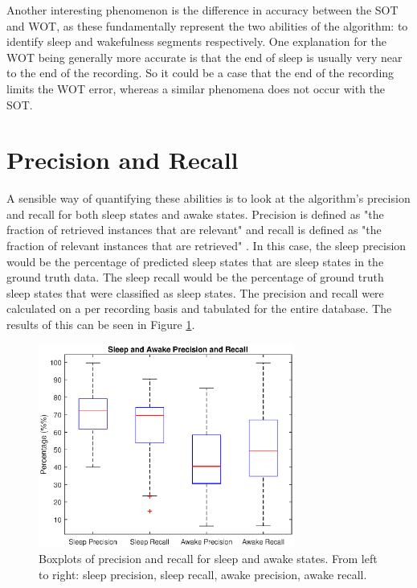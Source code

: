             Another interesting phenomenon is the difference in accuracy between the SOT and WOT, as these fundamentally represent the two abilities of the algorithm: to identify sleep and wakefulness segments respectively. One explanation for the WOT being generally more accurate is that the end of sleep is usually very near to the end of the recording. So it could be a case that the end of the recording limits the WOT error, whereas a similar phenomena does not occur with the SOT.

        \section{Precision and Recall}

            A sensible way of quantifying these abilities is to look at the algorithm's precision and recall for both sleep states and awake states. Precision is defined as "the fraction of retrieved instances that are relevant" and recall is defined as "the fraction of relevant instances that are retrieved" \cite{prec_rec}. In this case, the sleep precision would be the percentage of predicted sleep states that are sleep states in the ground truth data. The sleep recall would be the percentage of ground truth sleep states that were classified as sleep states. The precision and recall were calculated on a per recording basis and tabulated for the entire database. The results of this can be seen in Figure \ref{img_prec_recall}.

            \begin{figure}[h]
                \includegraphics[width=0.75\textwidth]{Images/prec_recall.eps}
                \centering
                \caption{Boxplots of precision and recall for sleep and awake states. From left to right: sleep precision, sleep recall, awake precision, awake recall.}
                \label{img_prec_recall}
            \end{figure}

